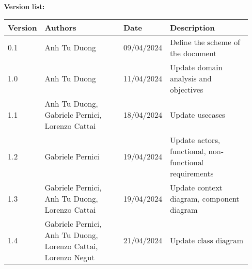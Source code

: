 \textcolor{RFIGreen}{\Large\bf Version list:}


\begin{center}

{\setlength{\extrarowheight}{6pt}
\begin{tabular}{|p{1.5cm}|p{4.5cm}|p{2.5cm}|p{5.5cm}|}
\hline
{\small\bf Version} & {\small\bf Authors} & {\small\bf Date} & {\small\bf Description}\\
\hline
0.1 & Anh Tu Duong & 09/04/2024  & Define the scheme of the document \\
\hline
1.0 & Anh Tu Duong & 11/04/2024  & Update domain analysis and objectives \\
\hline
1.1 & Anh Tu Duong, Gabriele Pernici, Lorenzo Cattai & 18/04/2024  & Update usecases \\
\hline
1.2 & Gabriele Pernici & 19/04/2024  & Update actors, functional, non-functional requirements \\
\hline
1.3 & Gabriele Pernici, Anh Tu Duong, Lorenzo Cattai & 19/04/2024  & Update context diagram, component diagram \\
\hline
1.4 & Gabriele Pernici, Anh Tu Duong, Lorenzo Cattai, Lorenzo Negut & 21/04/2024  & Update class diagram \\
\end{tabular}
}

\end{center}

\newpage
